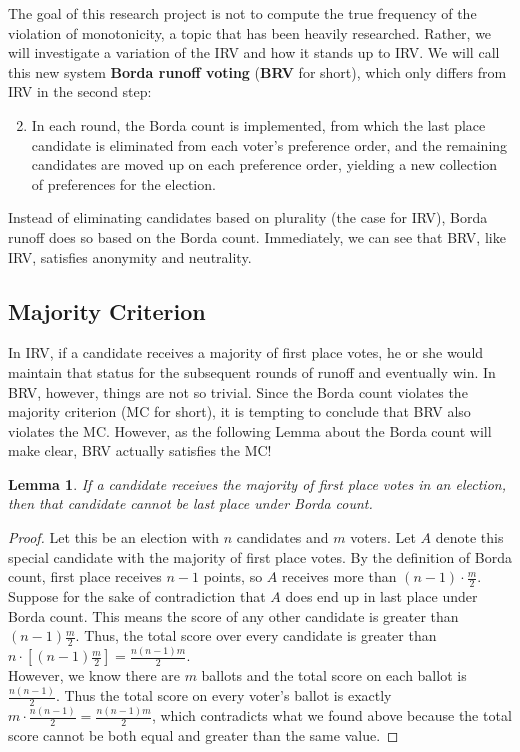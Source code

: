\documentclass{article}
\newtheorem{lem}[res]{Lemma}
\begin{document}
The goal of this research project is not to compute the true frequency of the violation of monotonicity, a topic that has been heavily researched\cite{Research2}. Rather, we will investigate a variation of the IRV and how it stands up to IRV. We will call this new system \textbf{Borda runoff voting} (\textbf{BRV} for short), which only differs from IRV in the second step:
\begin{enumerate}
	\setcounter{enumi}{1}
	\item  In each round, the Borda count is implemented, from which the last place candidate is eliminated from each voter’s preference order, and the remaining candidates are moved up on each preference order, yielding a new collection of preferences for the election.
\end{enumerate}
Instead of eliminating candidates based on plurality (the case for IRV), Borda runoff does so based on the Borda count. Immediately, we can see that BRV, like IRV, satisfies anonymity and neutrality. 

\subsection{Majority Criterion}
In IRV, if a candidate receives a majority of first place votes, he or she would maintain that status for the subsequent rounds of runoff and eventually win. In BRV, however, things are not so trivial. Since the Borda count violates the majority criterion (MC for short), it is tempting to conclude that BRV also violates the MC. However, as the following Lemma about the Borda count will make clear, BRV actually satisfies the MC!

\begin{lem}
	If a candidate receives the majority of first place votes in an election, then that candidate cannot be last place under Borda count.
\end{lem}

\begin{proof}
	Let this be an election with $n$ candidates and $m$ voters. Let $A$ denote this special candidate with the majority of first place votes. By the definition of Borda count, first place receives $n-1$ points, so $A$ receives more than $(n-1)\cdot \frac {m}{2}$. \\
	
	Suppose for the sake of contradiction that $A$ does end up in last place under Borda count. This means the score of any other candidate is greater than  $(n-1)\frac {m}{2}$. Thus, the total score over every candidate is greater than $n\cdot [(n-1)\frac {m}{2}] = \frac {n(n-1)m}{2}$. \\
	
	However, we know there are $m$ ballots and the total score on each ballot is $\frac {n(n-1)}{2}$. Thus the total score on every voter’s ballot is exactly $m\cdot \frac {n(n-1)}{2}=\frac {n(n-1)m}{2}$, which contradicts what we found above because the total score cannot be both equal and greater than the same value. 
\end{proof}
\end{document}
